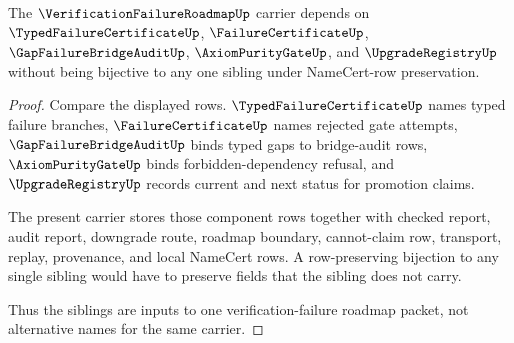 \begin{theorem}
\label{thm:verification-failure-roadmap-sibling-independence}
The $\VerificationFailureRoadmapUp$ carrier depends on $\TypedFailureCertificateUp$, $\FailureCertificateUp$, $\GapFailureBridgeAuditUp$, $\AxiomPurityGateUp$, and $\UpgradeRegistryUp$ without being bijective to any one sibling under NameCert-row preservation.
\end{theorem}
\begin{proof}
Compare the displayed rows. $\TypedFailureCertificateUp$ names typed failure branches, $\FailureCertificateUp$ names rejected gate attempts, $\GapFailureBridgeAuditUp$ binds typed gaps to bridge-audit rows, $\AxiomPurityGateUp$ binds forbidden-dependency refusal, and $\UpgradeRegistryUp$ records current and next status for promotion claims.

The present carrier stores those component rows together with checked report, audit report, downgrade route, roadmap boundary, cannot-claim row, transport, replay, provenance, and local NameCert rows. A row-preserving bijection to any single sibling would have to preserve fields that the sibling does not carry.

Thus the siblings are inputs to one verification-failure roadmap packet, not alternative names for the same carrier.
\end{proof}

